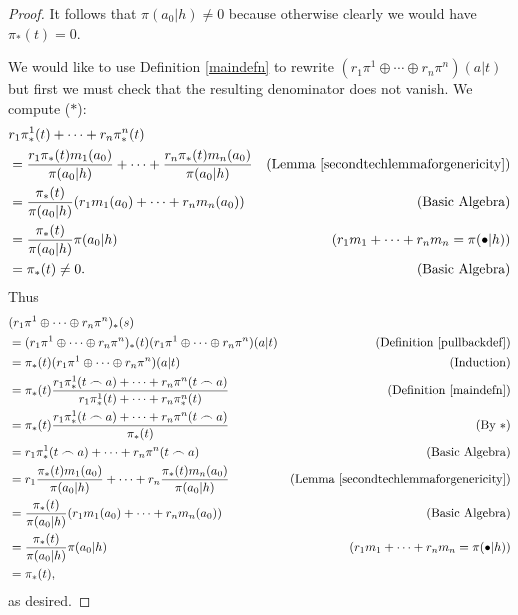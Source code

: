 \documentclass[runningheads]{llncs}
\begin{document}
\begin{proof}
    It follows that $\pi(a_0|h)\not=0$ because otherwise clearly
    we would have $\pi_*(t)=0$.

    We would like to use Definition \ref{maindefn} to rewrite
    $(r_1\pi^1\oplus\cdots\oplus r_n\pi^n)(a|t)$ but first we must
    check that the resulting denominator does not vanish. We compute ($*$):
    \begin{align*}
        &{} r_1\pi^1_*(t) + \cdots + r_n\pi^n_*(t)\\
            &= \frac{r_1\pi_*(t)m_1(a_0)}{\pi(a_0|h)}
                + \cdots +
                \frac{r_n\pi_*(t)m_n(a_0)}{\pi(a_0|h)}
                    &\mbox{(Lemma \ref{secondtechlemmaforgenericity})}\\
            &= \frac{\pi_*(t)}{\pi(a_0|h)}
                (r_1m_1(a_0) + \cdots + r_nm_n(a_0))
                    &\mbox{(Basic Algebra)}\\
            &= \frac{\pi_*(t)}{\pi(a_0|h)}\pi(a_0|h)
                    &\mbox{($r_1m_1+\cdots+r_nm_n=\pi(\bullet|h)$)}\\
            &= \pi_*(t)\not=0.
                    &\mbox{(Basic Algebra)}
    \end{align*}
    Thus
    \begin{align*}
        &{} (r_1\pi^1\oplus\cdots\oplus r_n\pi^n)_*(s)\\
            &= (r_1\pi^1\oplus\cdots\oplus r_n\pi^n)_*(t)
                (r_1\pi^1\oplus\cdots\oplus r_n\pi^n)(a|t)
                    &\mbox{(Definition \ref{pullbackdef})}\\
            &= \pi_*(t)(r_1\pi^1\oplus\cdots\oplus r_n\pi^n)(a|t)
                    &\mbox{(Induction)}\\
            &= \pi_*(t)\frac{r_1\pi^1_*(t\frown a)+\cdots+r_n\pi^n(t\frown a)}
                {r_1\pi^1_*(t)+\cdots+r_n\pi^n_*(t)}
                    &\mbox{(Definition \ref{maindefn})}\\
            &= \pi_*(t)\frac{r_1\pi^1_*(t\frown a)+\cdots+r_n\pi^n(t\frown a)}
                {\pi_*(t)}
                    &\mbox{(By $*$)}\\
            &= r_1\pi^1_*(t\frown a)+\cdots+r_n\pi^n(t\frown a)
                    &\mbox{(Basic Algebra)}\\
            &= r_1\frac{\pi_*(t)m_1(a_0)}{\pi(a_0|h)}
                +\cdots+r_n\frac{\pi_*(t)m_n(a_0)}{\pi(a_0|h)}
                    &\mbox{(Lemma \ref{secondtechlemmaforgenericity})}\\
            &= \frac{\pi_*(t)}{\pi(a_0|h)}(r_1m_1(a_0)+\cdots+r_nm_n(a_0))
                    &\mbox{(Basic Algebra)}\\
            &= \frac{\pi_*(t)}{\pi(a_0|h)}\pi(a_0|h)
                    &\mbox{($r_1m_1+\cdots+r_nm_n=\pi(\bullet|h)$)}\\
            &= \pi_*(t),
    \end{align*}
    as desired.


\end{proof}
\end{document}
